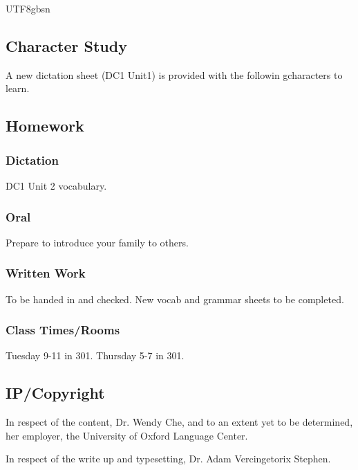 \documentclass{article}
\newcommand{\myfont}{gbsn} %
\begin{document}
\begin{CJK}{UTF8}{\myfont}
\subsection{Character Study}

A new dictation sheet (DC1 Unit1) is provided with the followin gcharacters to learn.

\subsection{Homework}

\subsubsection{Dictation}

DC1 Unit 2 vocabulary.

\subsubsection{Oral}

Prepare to introduce your family to others.

\subsubsection{Written Work}

To be handed in and checked.  New vocab and grammar sheets to be completed.

\subsubsection{Class Times/Rooms}

Tuesday 9-11 in 301.  Thursday 5-7 in 301.

\subsection{IP/Copyright}

In respect of the content, Dr. Wendy Che, and to an extent yet to be determined, her employer, the University of Oxford Language Center.

In respect of the write up and typesetting, Dr. Adam Vercingetorix Stephen.

\end{CJK} 
\end{document}
